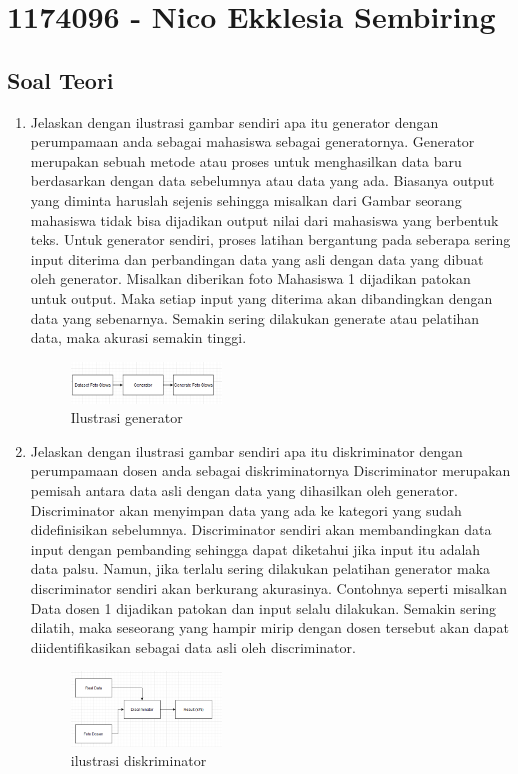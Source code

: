 \section{1174096 - Nico Ekklesia Sembiring}
\subsection{Soal Teori}
\begin{enumerate}

	\item Jelaskan dengan ilustrasi gambar sendiri apa itu generator dengan perumpamaan anda sebagai mahasiswa sebagai generatornya.
	\hfill\break
    Generator merupakan sebuah metode atau proses untuk menghasilkan data baru berdasarkan dengan data sebelumnya atau data yang ada. Biasanya output yang diminta haruslah sejenis sehingga misalkan dari Gambar seorang mahasiswa tidak bisa dijadikan output nilai dari mahasiswa yang berbentuk teks. Untuk generator sendiri, proses latihan bergantung pada seberapa sering input diterima dan perbandingan data yang asli dengan data yang dibuat oleh generator. Misalkan diberikan foto Mahasiswa 1 dijadikan patokan untuk output. Maka setiap input yang diterima akan dibandingkan dengan data yang sebenarnya. Semakin sering dilakukan generate atau pelatihan data, maka akurasi semakin tinggi.
    \hfill \break
    \begin{figure}[H]
	\centering
		\includegraphics[width=4cm]{figures/1174096/tugas8/t1.PNG}
		\caption{Ilustrasi generator}
	\end{figure}

	\item Jelaskan dengan ilustrasi gambar sendiri apa itu diskriminator dengan perumpamaan dosen anda sebagai diskriminatornya
    \hfill\break
    Discriminator merupakan pemisah antara data asli dengan data yang dihasilkan oleh generator. Discriminator akan menyimpan data yang ada ke kategori yang sudah dideﬁnisikan sebelumnya. Discriminator sendiri akan membandingkan data input dengan pembanding sehingga dapat diketahui jika input itu adalah data palsu. Namun, jika terlalu sering dilakukan pelatihan generator maka discriminator sendiri akan berkurang akurasinya. Contohnya seperti misalkan Data dosen 1 dijadikan patokan dan input selalu dilakukan. Semakin sering dilatih, maka seseorang yang hampir mirip dengan dosen tersebut akan dapat diidentiﬁkasikan sebagai data asli oleh discriminator.
    \begin{figure}[H]
	\centering
		\includegraphics[width=4cm]{figures/1174096/tugas8/t2.PNG}
		\caption{ilustrasi diskriminator}
	\end{figure}


\end{enumerate}

